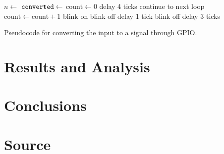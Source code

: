 \documentclass[11pt]{article}
\begin{document}
\begin{algorithm}[ht]
    \begin{algorithmic}[l]
        \State $n \gets$ 
        \State $\texttt{converted} \gets$ 
            \State $\text{count} \gets 0$
                \State delay 4 ticks
                \State continue to next loop
            \EndIf
                \State $\text{count} \gets \text{count} + 1$
            \EndWhile
                    \State blink on
                \Else
                    \State blink off
                \EndIf
                \State delay 1 tick
            \EndFor
            \State blink off
            \State delay 3 ticks
        \EndFor
        \EndProcedure
    \end{algorithmic}
    \caption{Pseudocode for converting the input to a signal through GPIO.}
    \label{alg:blink_signal_from_input}
\end{algorithm}


\section{Results and Analysis}
\label{sec:results_and_analysis}




\section{Conclusions}
\label{sec:conclusions}




\section{Source}
\label{sec:source}



\end{document}
